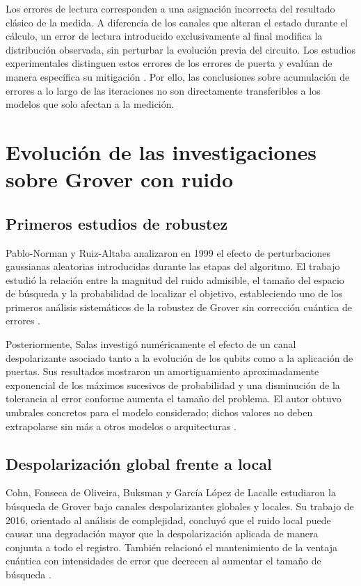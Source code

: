 \documentclass[11pt,a4paper]{article}
\begin{document}
Los errores de lectura corresponden a una asignación incorrecta del resultado clásico de la medida. A diferencia de los canales que alteran el estado durante el cálculo, un error de lectura introducido exclusivamente al final modifica la distribución observada, sin perturbar la evolución previa del circuito. Los estudios experimentales distinguen estos errores de los errores de puerta y evalúan de manera específica su mitigación \cite{pokharel2024}. Por ello, las conclusiones sobre acumulación de errores a lo largo de las iteraciones no son directamente transferibles a los modelos que solo afectan a la medición.

\section{Evolución de las investigaciones sobre Grover con ruido}

\subsection{Primeros estudios de robustez}

Pablo-Norman y Ruiz-Altaba analizaron en 1999 el efecto de perturbaciones gaussianas aleatorias introducidas durante las etapas del algoritmo. El trabajo estudió la relación entre la magnitud del ruido admisible, el tamaño del espacio de búsqueda y la probabilidad de localizar el objetivo, estableciendo uno de los primeros análisis sistemáticos de la robustez de Grover sin corrección cuántica de errores \cite{pablonorman1999}.

Posteriormente, Salas investigó numéricamente el efecto de un canal despolarizante asociado tanto a la evolución de los qubits como a la aplicación de puertas. Sus resultados mostraron un amortiguamiento aproximadamente exponencial de los máximos sucesivos de probabilidad y una disminución de la tolerancia al error conforme aumenta el tamaño del problema. El autor obtuvo umbrales concretos para el modelo considerado; dichos valores no deben extrapolarse sin más a otros modelos o arquitecturas \cite{salas2008}.

\subsection{Despolarización global frente a local}

Cohn, Fonseca de Oliveira, Buksman y García López de Lacalle estudiaron la búsqueda de Grover bajo canales despolarizantes globales y locales. Su trabajo de 2016, orientado al análisis de complejidad, concluyó que el ruido local puede causar una degradación mayor que la despolarización aplicada de manera conjunta a todo el registro. También relacionó el mantenimiento de la ventaja cuántica con intensidades de error que decrecen al aumentar el tamaño de búsqueda \cite{cohn2016}.
\end{document}

